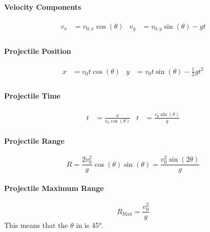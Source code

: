 \paragraph{Velocity Components}\label{par:Projectile Velocity Components}
\begin{equation}\label{eq:Projectile Velocity Components}
  \begin{aligned}
    v_{x} &= v_{0,x} \cos ( \theta ) & v_{y} &= v_{0,y} \sin ( \theta ) -gt \\
  \end{aligned}
\end{equation}

\paragraph{Projectile Position}\label{par:Projectile Position}
\begin{equation}\label{eq:Projectile Position}
  \begin{aligned}
    x &= v_{0} t \cos ( \theta ) & y &= v_{0} t \sin ( \theta ) - \frac{1}{2} gt^{2} \\
  \end{aligned}
\end{equation}

\paragraph{Projectile Time}\label{par:Projectile Time}
\begin{equation}\label{eq:Projectile Time}
  \begin{aligned}
    t &= \frac{x}{v_{0} \cos ( \theta )} & t &= \frac{v_{0} \sin ( \theta )}{g}
  \end{aligned}
\end{equation}

\paragraph{Projectile Range}\label{par:Projectile Range}
\begin{equation}\label{eq:Projectile Range}
  R = \frac{2 v_{0}^{2}}{g} \cos ( \theta ) \sin ( \theta ) = \frac{v_{0}^{2} \sin(2 \theta)}{g}
\end{equation}

\paragraph{Projectile Maximum Range}\label{par:Projectile Maximum Range}
\begin{equation}\label{eq:Projectile Maximum Range}
  R_{\text{Max}} = \frac{v_{0}^{2}}{g}
\end{equation}
This means that the $\theta$ in  is \ang{45}.

